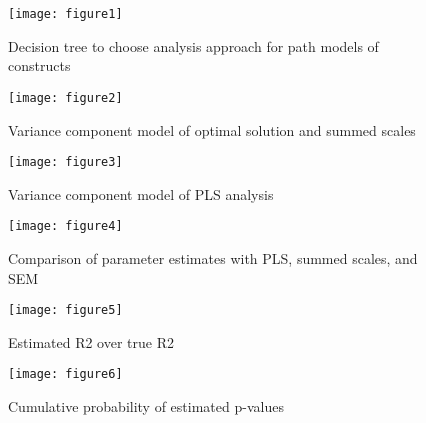 \documentclass[10pt]{a0poster}
\begin{document}
%
%

\begin{figure}[h!]
\centering
\texttt{[image: figure1]}
\caption{Decision tree to choose analysis approach for path models of constructs}
\end{figure}

\begin{figure}[h!]
\centering
\texttt{[image: figure2]}
\caption{Variance component model of optimal solution and summed scales}
\end{figure}

\begin{figure}[h!]
\centering
\texttt{[image: figure3]}
\caption{Variance component model of PLS analysis}
\end{figure}

\begin{figure}[h!]
\centering
\texttt{[image: figure4]}
\caption{Comparison of parameter estimates with PLS, summed scales, and  SEM}
\end{figure}

\begin{figure}[h!]
\centering
\texttt{[image: figure5]}
\caption{Estimated R2 over true R2}
\end{figure}

\begin{figure}[h!]
\centering
\texttt{[image: figure6]}
\caption{Cumulative probability of estimated p-values}
\end{figure}

%
%

\end{document}
